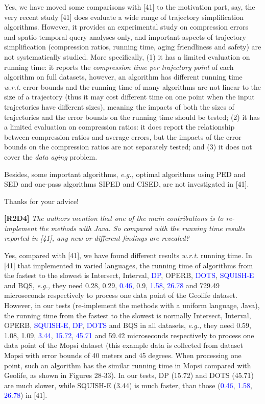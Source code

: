 \documentclass{letter}
\newcommand{\eg}{\emph{e.g.,}\xspace}
\newcommand{\wrt}{\emph{w.r.t.}\xspace}
\begin{document}
{Yes, we have moved some comparisons with [41] to the motivation part, say, the very recent study [41] does evaluate a wide range of trajectory simplification algorithms.
However, it provides {an experimental study} on compression errors and spatio-temporal query analyses only, and important aspects of trajectory simplification (compression ratios, running time, aging friendliness and safety) are not systematically studied. 
{More specifically,}
{(1) it has a limited evaluation on running time: it reports the \emph{compression time per trajectory point} of each algorithm on full datasets, however, an algorithm has different running time \wrt error bounds and the running time of many algorithms are not linear to the size of a trajectory (thus it may cost different time on one point when the input trajectories have different sizes), meaning the impacts of both the sizes of trajectories and the error bounds on the running time should be tested;}
%
{(2) it has a limited evaluation on compression ratios: it does report the relationship between compression ratios and average errors, but the impacts of the error bounds on the compression ratios are not separately tested; and }
%
(3) it does not cover the \emph{data aging} problem.
%
{Besides, some important algorithms, \eg optimal algorithms using PED and SED and one-pass algorithms SIPED and CISED, are not investigated in [41]. 
%


Thanks for your advice!

\textbf{[R2D4]} \emph{The authors mention that one of the main contributions is to re-implement the methods with Java. So compared with the running time results reported in [41], any new or different findings are revealed?}


Yes, compared with [41], we have found different results \wrt running time. 
In [41] that implemented in varied languages, the running time of algorithms from the fastest to the slowest is Intersect, Interval, \textcolor{blue}{DP}, OPERB, \textcolor{blue}{DOTS}, \textcolor{blue}{SQUISH-E} and BQS, \eg they need 0.28, 0.29, \textcolor{blue}{0.46}, 0.9, \textcolor{blue}{1.58}, \textcolor{blue}{26.78} and 729.49 microseconds respectively to process one data point of the Geolife dataset.
However, in our tests (re-implement the methods with a uniform language, Java), the running time from the fastest to the slowest is normally Intersect, Interval, OPERB, \textcolor{blue}{SQUISH-E}, \textcolor{blue}{DP},  \textcolor{blue}{DOTS} and BQS in all datasets, \eg they need 0.59, 1.08, 1.09, \textcolor{blue}{3.44}, \textcolor{blue}{15.72}, \textcolor{blue}{45.71} and 59.42 microseconds respectively to process one data point of the Mopsi dataset (this example data is collected from dataset Mopsi with error bounds of 40 meters and 45 degrees. When processing one point, such an algorithm has the similar running time in Mopsi compared with Geolife, as shown in Figures 28-33). In our tests, DP (15.72) and DOTS (45.71) are much slower, while SQUISH-E (3.44) is much faster, than those (\textcolor{blue}{0.46}, \textcolor{blue}{1.58}, \textcolor{blue}{26.78}) in [41].


}}
\end{document}
